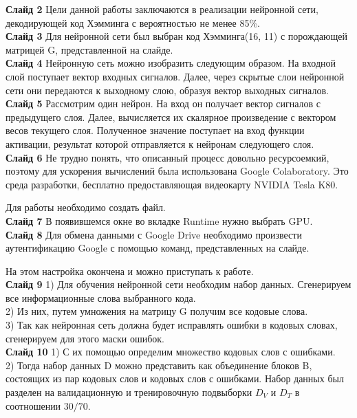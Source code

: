\documentclass[a4paper]{article}
\begin{document}
\textbf{Слайд 2}
Цели данной работы заключаются в реализации нейронной сети, декодирующей код Хэмминга с вероятностью не менее 85\%. \\

\textbf{Слайд 3}
Для нейронной сети был выбран код Хэмминга(16, 11) с порождающей матрицей G, представленной на слайде.\\

\textbf{Слайд 4}
Нейронную сеть можно изобразить следующим образом. На входной слой поступает вектор входных сигналов. Далее, через скрытые слои нейронной сети они передаются к выходному слою, образуя вектор выходных сигналов.\\

\textbf{Слайд 5}
Рассмотрим один нейрон. На вход он получает вектор сигналов с предыдущего слоя. Далее, вычисляется их скалярное произведение с вектором весов текущего слоя. Полученное значение поступает на вход функции активации, результат которой отправляется к нейронам следующего слоя. \\

\textbf{Слайд 6}
Не трудно понять, что описанный процесс довольно ресурсоемкий, поэтому для ускорения вычислений была использована Google Colaboratory. Это среда разработки, бесплатно предоставляющая видеокарту NVIDIA Tesla K80.

Для работы необходимо создать файл.\\

\textbf{Слайд 7}
В появившемся окне во вкладке Runtime нужно выбрать GPU. \\

\textbf{Слайд 8}
Для обмена данными с Google Drive необходимо произвести аутентификацию Google с помощью команд, представленных на слайде. 

На этом настройка окончена и можно приступать к работе.\\

\textbf{Слайд 9}
1) Для обучения нейронной сети необходим набор данных. Сгенерируем все информационные слова выбранного кода.\\
2) Из них, путем умножения на матрицу G получим все кодовые слова.\\
3) Так как нейронная сеть должна будет исправлять ошибки в кодовых словах, сгенерируем для этого маски ошибок.\\

\textbf{Слайд 10}
1) С их помощью определим множество кодовых слов с ошибками. \\
2) Тогда набор данных D можно представить как объединение блоков B, состоящих из пар кодовых слов и кодовых слов с ошибками. Набор данных был разделен на валидационную и тренировочную подвыборки $D_V$ и $D_T$ в соотношении $30/70$.\\
\end{document}
